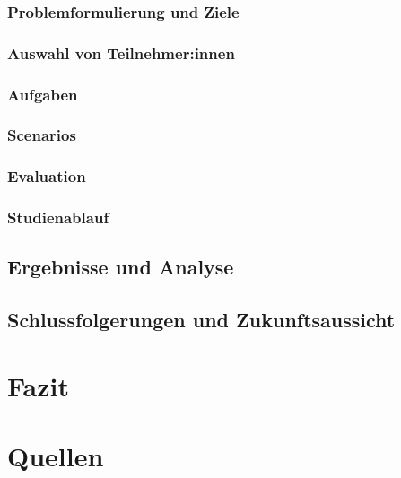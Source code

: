 \documentclass[a4paper, 12pt, oneside, BCOR=1cm,toc=chapterentrywithdots]{scrbook}
\begin{document}
\subsection{Problemformulierung und Ziele}
\subsection{Auswahl von Teilnehmer:innen}
\subsection{Aufgaben}
\subsection{Scenarios}
\subsection{Evaluation}
\subsection{Studienablauf}
\section{Ergebnisse und Analyse}
\section{Schlussfolgerungen und Zukunftsaussicht}

\chapter{Fazit}


\nocite{*}
\chapter*{Quellen}
\begingroup
\let\clearpage\relax
\printbibliography[filter=articles, title=Artikel, heading=subbibliography]
\printbibliography[type=book, title=Bücher, heading=subbibliography]
\printbibliography[type=misc, title=sonstige, heading=subbibliography]
\endgroup

\printindex
\end{document}
